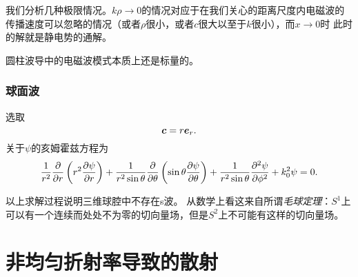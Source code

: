 我们分析几种极限情况。$k \rho \to 0$的情况对应于在我们关心的距离尺度内电磁波的传播速度可以忽略的情况（或者$\rho$很小，或者$c$很大以至于$k$很小），而$x \to 0$时 %
此时的解就是静电势的通解。

圆柱波导中的电磁波模式本质上还是标量的。

\subsection{球面波}

选取
\begin{equation}
    \vb*{c} = r \vb*{e}_r.
\end{equation}
关于$\psi$的亥姆霍兹方程为
\begin{equation}
    \frac{1}{r^2} \pdv{r}\left( r^2 \pdv{\psi}{r} \right) + \frac{1}{r^2 \sin \theta} \pdv{\theta} \left( \sin \theta \pdv{\psi}{\theta} \right) + \frac{1}{r^2 \sin \theta} \pdv[2]{\psi}{\phi} + k_0^2 \psi = 0.
\end{equation}

以上求解过程说明三维球腔中不存在s波。
从数学上看这来自所谓\emph{毛球定理}：$S^1$上可以有一个连续而处处不为零的切向量场，但是$S^2$上不可能有这样的切向量场。

\chapter{非均匀折射率导致的散射}